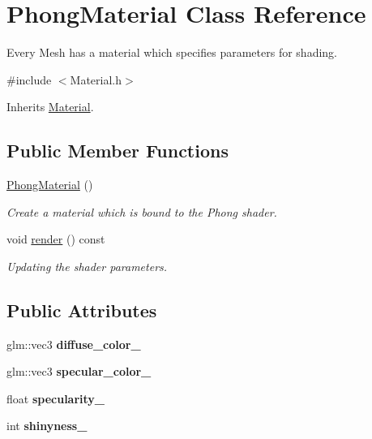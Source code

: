 \hypertarget{class_phong_material}{\section{Phong\-Material Class Reference}
\label{class_phong_material}
}


Every Mesh has a material which specifies parameters for shading.  




{\ttfamily \#include $<$Material.\-h$>$}



Inherits \hyperlink{class_material}{Material}.

\subsection*{Public Member Functions}
\begin{DoxyCompactItemize}
\item 
\hypertarget{class_phong_material_a5edfd5d4415cb5f7c10e8eea49cb692d}{\hyperlink{class_phong_material_a5edfd5d4415cb5f7c10e8eea49cb692d}{Phong\-Material} ()}\label{class_phong_material_a5edfd5d4415cb5f7c10e8eea49cb692d}

\begin{DoxyCompactList}\small\item\em Create a material which is bound to the Phong shader. \end{DoxyCompactList}\item 
void \hyperlink{class_phong_material_a1fb4a309e9baf9b014c3a7c63927c407}{render} () const 
\begin{DoxyCompactList}\small\item\em Updating the shader parameters. \end{DoxyCompactList}\end{DoxyCompactItemize}
\subsection*{Public Attributes}
\begin{DoxyCompactItemize}
\item 
\hypertarget{class_phong_material_a25435084925806a2224c21b52b03208e}{glm\-::vec3 {\bfseries diffuse\-\_\-color\-\_\-}}\label{class_phong_material_a25435084925806a2224c21b52b03208e}

\item 
\hypertarget{class_phong_material_a2c211e6380feea43ccb3de3011634012}{glm\-::vec3 {\bfseries specular\-\_\-color\-\_\-}}\label{class_phong_material_a2c211e6380feea43ccb3de3011634012}

\item 
\hypertarget{class_phong_material_a6820ac548a2a86d83ce0f50a15bec145}{float {\bfseries specularity\-\_\-}}\label{class_phong_material_a6820ac548a2a86d83ce0f50a15bec145}

\item 
\hypertarget{class_phong_material_aeb629ee9cbb87c62836b94e1b2225e39}{int {\bfseries shinyness\-\_\-}}\label{class_phong_material_aeb629ee9cbb87c62836b94e1b2225e39}

\end{DoxyCompactItemize}

